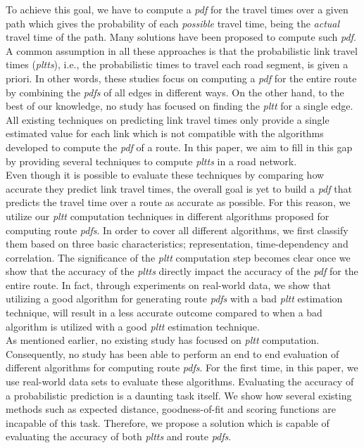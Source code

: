 To achieve this goal, we have to compute a \textit{pdf} for the travel times over a given path which gives the probability of each \textit{possible} travel time, being the \textit{actual} travel time of the path. Many solutions have been proposed to compute such \textit{pdf}. A common assumption in all these approaches is that the probabilistic link travel times (\textit{pltts}), i.e., the probabilistic times to travel each road segment, is given a priori. In other words, these studies focus on computing a \textit{pdf} for the entire route by combining the \textit{pdfs} of all edges in different ways. On the other hand, to the best of our knowledge, no study has focused on finding the \textit{pltt} for a single edge. All existing techniques on predicting link travel times only provide a single estimated value for each link \cite{Pan13, Xu15} which is not compatible with the algorithms developed to compute the \textit{pdf} of a route. In this paper, we aim to fill in this gap by providing several techniques to compute \textit{pltts} in a road network.\\
Even though it is possible to evaluate these techniques by comparing how accurate they predict link travel times, the overall goal is yet to build a \textit{pdf} that predicts the travel time over a route as accurate as possible. For this reason, we utilize our \textit{pltt} computation techniques in different algorithms proposed for computing route \textit{pdfs}. In order to cover all different algorithms, we first classify them based on three basic characteristics; representation, time-dependency and correlation. The significance of the \textit{pltt} computation step becomes clear once we show that the accuracy of the \textit{pltts} directly impact the accuracy of the \textit{pdf} for the entire route. In fact, through experiments on real-world data, we show that utilizing a good algorithm for generating route \textit{pdfs} with a bad \textit{pltt} estimation technique, will result in a less accurate outcome compared to when a bad algorithm is utilized with a good \textit{pltt} estimation technique.\\
As mentioned earlier, no existing study has focused on \textit{pltt} computation. Consequently, no study has been able to perform an end to end evaluation of different algorithms for computing route \textit{pdfs}. For the first time, in this paper, we use real-world data sets to evaluate these algorithms. Evaluating the accuracy of a probabilistic prediction is a daunting task itself. We show how several existing methods such as expected distance, goodness-of-fit and scoring functions are incapable of this task. Therefore, we propose a solution which is capable of evaluating the accuracy of both \textit{pltts} and route \textit{pdfs}.\\
